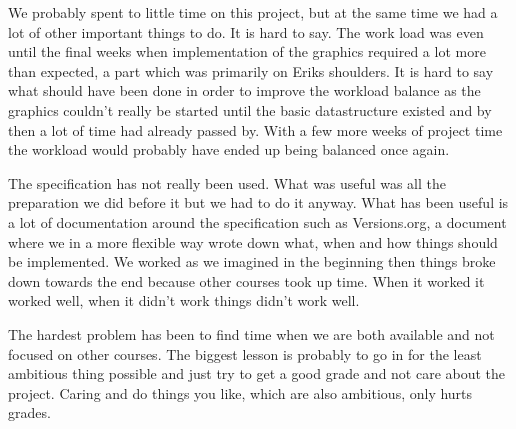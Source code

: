 \documentclass[12pt,a4paper]{article}
\begin{document}
We probably spent to little time on this project, but at the same time we had a lot of other important things to do. It is hard to say.
The work load was even until the final weeks when implementation of the graphics required a lot more than expected, a part which was primarily on Eriks shoulders.
It is hard to say what should have been done in order to improve the workload balance as the graphics couldn't really be started until the basic datastructure existed and by then a lot of time had already passed by. With a few more weeks of project time the workload would probably have ended up being balanced once again.

The specification has not really been used. What was useful was all the preparation we did before it but we had to do it anyway.
What has been useful is a lot of documentation around the specification such as Versions.org, a document where we in a more flexible way wrote down what, when and how things should be implemented.
We worked as we imagined in the beginning then things broke down towards the end because other courses took up time. When it worked it worked well, when it didn't work things didn't work well.

The hardest problem has been to find time when we are both available and not focused on other courses.
The biggest lesson is probably to go in for the least ambitious thing possible and just try to get a good grade and not care about the project.
Caring and do things you like, which are also ambitious, only hurts grades.

\end{document}
